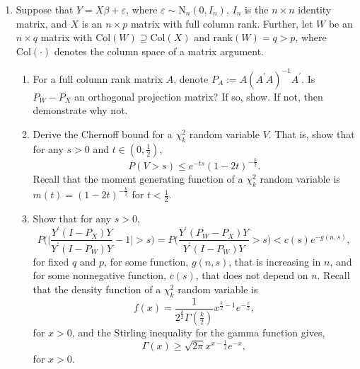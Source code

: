 \documentclass[11pt]{article}
\begin{document}
\begin{enumerate}
\item Suppose that $Y = X\beta + \varepsilon$, where $\varepsilon \sim \text{N}_{n}(0,I_{n})$, $I_{n}$ is the $n\times n$ identity matrix, and $X$ is an $n\times p$ matrix with full column rank.  Further, let $W$ be an $n\times q$ matrix with $\text{Col}(W) \supseteq \text{Col}(X)$ and $\text{rank}(W) = q > p$, where $\text{Col}(\cdot)$ denotes the column space of a matrix argument.
\begin{enumerate}
\item For a full column rank matrix $A$, denote $P_{A} := A(A^{\prime}A)^{-1}A^{\prime}$.  Is $P_{W} - P_{X}$ an orthogonal projection matrix?  If so, show.  If not, then demonstrate why not.
\item Derive the Chernoff bound for a $\chi^{2}_{k}$ random variable $V$.  That is, show that for any $s > 0$ and $t \in (0, \frac{1}{2})$,
\[
P(V > s) \le e^{-ts}(1-2t)^{-\frac{k}{2}}.
\] 
Recall that the moment generating function of a $\chi^{2}_{k}$ random variable is $m(t) =  (1-2t)^{-\frac{k}{2}}$ for $t < \frac{1}{2}$.
\item Show that for any $s > 0$,
\[
P\bigg(\bigg|\frac{Y^{\prime}(I - P_{X})Y}{Y^{\prime}(I - P_{W})Y} - 1\bigg| > s \bigg) = P\bigg(\frac{Y^{\prime}(P_{W} - P_{X})Y}{Y^{\prime}(I - P_{W})Y} > s \bigg) < c(s) e^{-g(n,s)},
\]
for fixed $q$ and $p$, for some function, $g(n,s)$, that is increasing in $n$, and for some nonnegative function, $c(s)$, that does not depend on $n$.  Recall that the density function of a $\chi^{2}_{k}$ random variable is 
\[
f(x) = \frac{1}{2^{\frac{k}{2}}\Gamma(\frac{k}{2})} x^{\frac{k}{2}-1}e^{-\frac{x}{2}},
\] 
for $x > 0$, and the Stirling inequality for the gamma function gives,
\[
\Gamma(x) \ge \sqrt{2\pi} x^{x-\frac{1}{2}}e^{-x},
\]
for $x > 0$.
\end{enumerate}



\end{enumerate}
\end{document}
